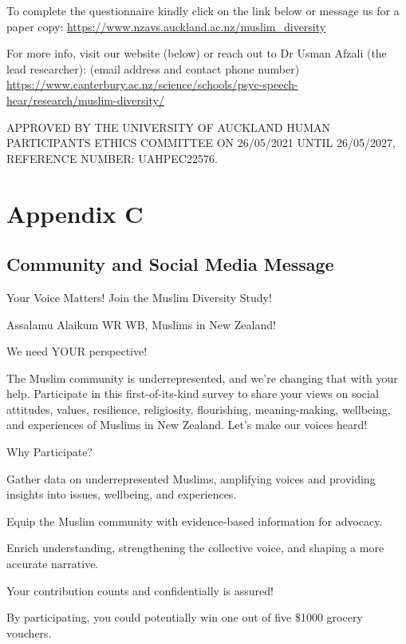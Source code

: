\documentclass[
]{interact}
\begin{document}
\noindent To complete the questionnaire kindly click on the link below
or message us for a paper copy:
\url{https://www.nzavs.auckland.ac.nz/muslim_diversity}

\noindent For more info, visit our website (below) or reach out to Dr
Usman Afzali (the lead researcher): (email address and contact phone
number)
\url{https://www.canterbury.ac.nz/science/schools/psyc-speech-hear/research/muslim-diversity/}

\noindent APPROVED BY THE UNIVERSITY OF AUCKLAND HUMAN PARTICIPANTS
ETHICS COMMITTEE ON 26/05/2021 UNTIL 26/05/2027, REFERENCE NUMBER:
UAHPEC22576.

\newpage{}

\section{Appendix C}\label{appendix-c}

\subsection{Community and Social Media
Message}\label{community-and-social-media-message}

Your Voice Matters! Join the Muslim Diversity Study!

\noindent Assalamu Alaikum WR WB, Muslims in New Zealand!

\noindent We need YOUR perspective!

\noindent The Muslim community is underrepresented, and we're changing
that with your help. Participate in this first-of-its-kind survey to
share your views on social attitudes, values, resilience, religiosity,
flourishing, meaning-making, wellbeing, and experiences of Muslims in
New Zealand. Let's make our voices heard!

\noindent Why Participate?

\noindent Gather data on underrepresented Muslims, amplifying voices and
providing insights into issues, wellbeing, and experiences.

\noindent Equip the Muslim community with evidence-based information for
advocacy.

\noindent Enrich understanding, strengthening the collective voice, and
shaping a more accurate narrative.

\noindent Your contribution counts and confidentially is assured!

\noindent By participating, you could potentially win one out of five
\$1000 grocery vouchers.
\end{document}
